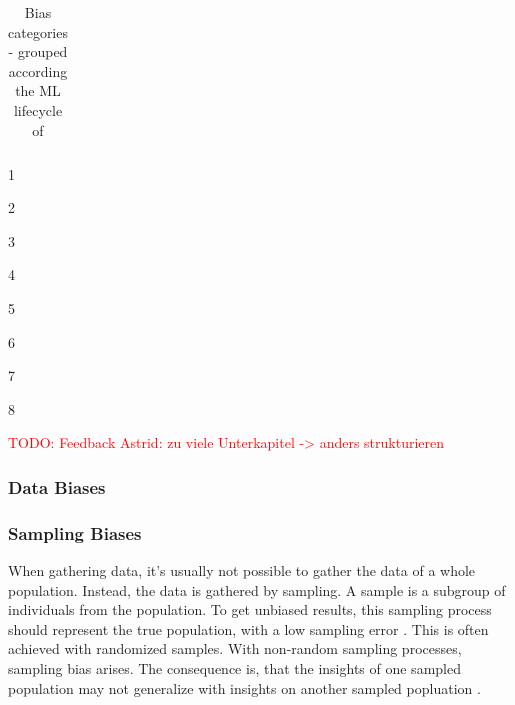 \documentclass[12pt, a4paper, oneside]{book}   	%
\renewcommand{\todo}[1]{\textcolor{red}{TODO: #1}}
\renewcommand{\paragraph}[1]{%
	\subsubsection*{#1}%
}
\newcommand{\tblWidthDescription}{\hsize=0.6\hsize\raggedright}
\newcommand{\tblWidthContext}{\hsize=0.2\hsize}
\begin{document}
\begin{table}[H]
\begin{threeparttable}
\begin{tabularx}{\textwidth}{>{\tblWidthDescription}X|>{\tblWidthContext}X|>{\tblWidthContext}X}
						\bottomrule
					\end{tabularx}
					\begin{tablenotes}
						\footnotesize
						\begin{minipage}{0.33\textwidth}\raggedright
							\item[1] \autocite{Mehrabi_2021}
							\item[2] \autocite{HP_2022}
							\item[3] \autocites{Mester_2022}
						\end{minipage}%
						\begin{minipage}{0.33\textwidth}\raggedright
							\item[4] \autocite{Chakraborty_2024}
							\item[5] \autocite{Young_2020}
							\item[6] \autocite{Montoya_2025}
						\end{minipage}%
						\begin{minipage}{0.33\textwidth}\raggedright
							\item[7] \autocites{Mester_2017}
							\item[8] \autocite{Delgado-Rodriguez_2004}
						\end{minipage}%
					\end{tablenotes}
				\end{threeparttable}
				\caption{Bias categories - grouped according the \gls{ML} lifecycle of \textcite{Mehrabi_2021}}
				\label{tab:biases_types}
			\end{table}
			
			\todo{Feedback Astrid: zu viele Unterkapitel -> anders strukturieren}
			\subsubsection{Data Biases}
				
				\paragraph{Sampling Biases}
				When gathering data, it's usually not possible to gather the data of a whole population. Instead, the data is gathered by sampling. A sample is a subgroup of individuals from the population. To get unbiased results, this sampling process should represent the true population, with a low sampling error \autocites{HP_2022}. This is often achieved with randomized samples. With non-random sampling processes, sampling bias arises. The consequence is, that the insights of one sampled population may not generalize with insights on another sampled popluation \autocite{Mehrabi_2021}.
				
\end{document}
